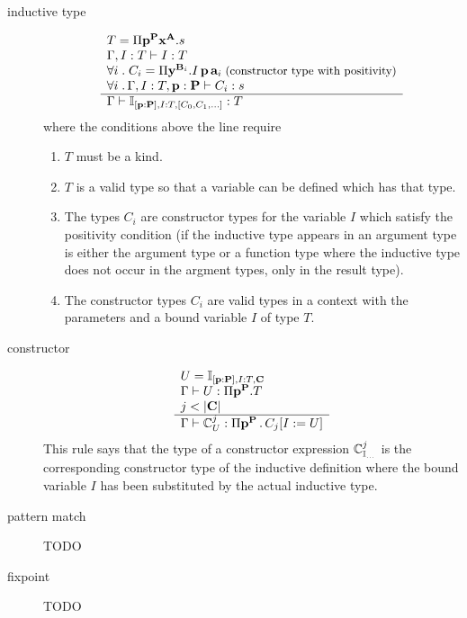 \begin{definition}
\begin{description}
  \item[inductive type]
    $$
    \begin{array}{l}  T = \Pi \mathbf{p}^{\mathbf{P}} \mathbf{x}^{\mathbf{A}}.s
      \\
      \Gamma, I:T \vdash I:T
      \\
      \forall i\;.\; C_i = \Pi \mathbf{y}^{\mathbf{B}_i}. I \,\mathbf{p} \, \mathbf{a}_i
      \;\text{\small(constructor type with positivity)}
      \\
      \forall i\;.\, \Gamma, I:T, \mathbf{p}:\mathbf{P} \vdash C_i : s
     \\ \hline 
      \Gamma \vdash
      \mathbb{I}_{[\mathbf{p}:\mathbf{P}], I:T, [C_0,C_1,\ldots]}
      :
      T
    \end{array}
    $$
    where the conditions above the line require
    \begin{enumerate}
    \item $T$ must be a kind.

    \item $T$ is a valid type so that a
      variable can be defined which has that type.

    \item The types $C_i$ are constructor types for the variable $I$ which
      satisfy the positivity condition (if the inductive
      type appears in an argument type is either the argument type or a
      function type where the inductive type does not occur in the argment
      types, only in the result type).

    \item The constructor types $C_i$ are valid types in a context with the
      parameters and a bound variable $I$ of type $T$.
    \end{enumerate}


  \item[constructor]
    $$
    \begin{array}{l} 
      U = \mathbb{I}_{[\mathbf{p}:\mathbf{P}], I:T, \mathbf{C}}
      \\
      \Gamma
      \vdash
      U
      :
      \Pi \mathbf{p}^{\mathbf{P}}.T
      \\
      j < |\mathbf{C}|
     \\ \hline 
      \Gamma \vdash
      \mathbb{C}^j_U
      :
      \Pi \mathbf{p}^{\mathbf{P}} \,.\, C_j[I := U]
    \end{array}
    $$
    This rule says that the type of a constructor expression
    $\mathbb{C}^j_{\mathbb{I}_{\ldots}}$ is the corresponding constructor type
    of the inductive definition where the bound variable $I$ has been
    substituted by the actual inductive type.


  \item[pattern match]
    TODO

  \item[fixpoint]
    TODO

  \end{description}
\end{definition}




